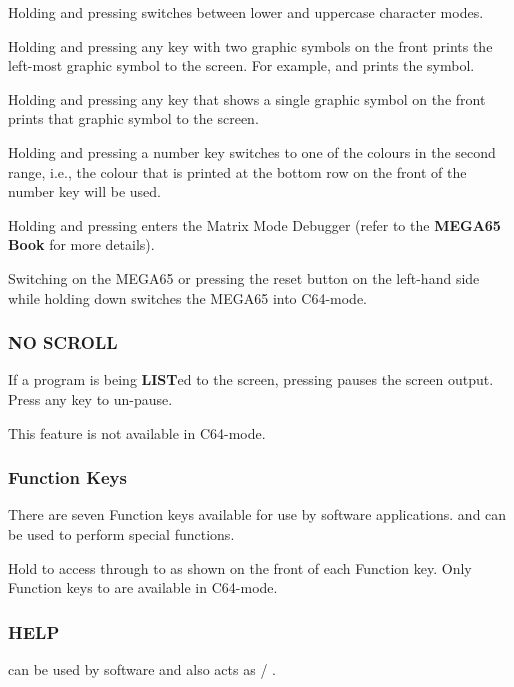 Holding  and pressing \megasymbolkey switches between lower and uppercase character modes.

Holding \megasymbolkey and pressing any key with two graphic symbols on the front prints the left-most graphic symbol to the screen. For example,
\megasymbolkey and  prints the  symbol.

Holding \megasymbolkey and pressing any key that shows a single graphic symbol on the front prints that graphic symbol to the screen.

Holding \megasymbolkey and pressing a number key switches to one of the colours in the second range, i.e., the colour that is printed at the bottom row on the front of the number key will be used.

Holding \megasymbolkey and pressing  enters the Matrix Mode Debugger (refer to the {\bf MEGA65 Book} for more details).

Switching on the MEGA65 or pressing the reset button on the left-hand side while holding down \megasymbolkey switches the MEGA65 into C64-mode.

\subsubsection{NO SCROLL}
If a program is being {\bf LIST}ed to the screen, pressing  pauses the screen output. Press any key to un-pause.

This feature is not available in C64-mode.

\subsubsection{Function Keys}
There are seven Function keys available for use by software applications.       and  can be used to perform special functions.

Hold  to access  through to  as shown on the front of each Function key.
Only Function keys  to  are available in C64-mode.

\subsubsection{HELP}
 can be used by software and also acts as  / .

